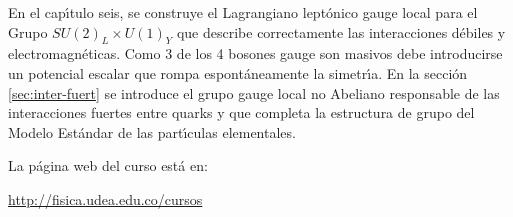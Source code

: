 En el cap\'\i tulo seis, se construye el Lagrangiano lept\'onico gauge local para el Grupo $SU(2)_L\times U(1)_Y$ que describe correctamente las interacciones d\'ebiles y electromagn\'eticas. Como 3 de los 4 bosones gauge son masivos debe introducirse un potencial escalar que rompa espont\'aneamente la simetr\'\i a. En la secci\'on \ref{sec:inter-fuert} se introduce el grupo gauge local no Abeliano responsable de las interacciones fuertes entre quarks y que completa la estructura de grupo del Modelo Est\'andar de las part\'\i culas elementales. 

La p\'agina web del curso est\'a en:

\url{http://fisica.udea.edu.co/cursos}%





